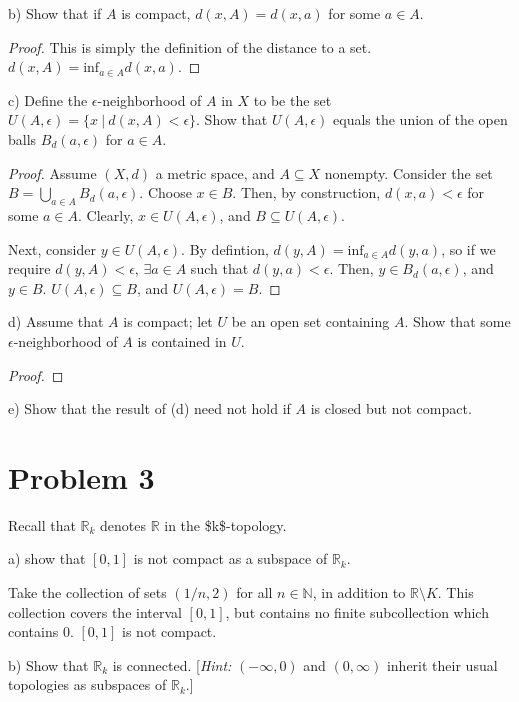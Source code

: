 \documentclass[11pt]{article}
\begin{document}
b) Show that if \(A\) is compact, \(d(x,A) = d(x,a)\) for some \(a \in A\). 
\begin{proof}
This is simply the definition of the distance to a set. \(d(x,A) =
\text{inf}_{a\in A} d(x,a)\). 
\end{proof}

c) Define the \(\epsilon\)-neighborhood of \(A\) in \(X\) to be the set \(U(A,\epsilon)
= \{x\ |\ d(x,A) < \epsilon\}\). Show that \(U(A,\epsilon)\) equals the union of
the open balls \(B_d(a, \epsilon)\) for \(a\in A\). 

\begin{proof}
Assume \((X,d)\) a metric space, and \(A\subseteq X\) nonempty. Consider the set \(B
= \bigcup\limits_{a\in A} B_d(a, \epsilon)\). Choose \(x \in B\). Then, by
construction, \(d(x,a) < \epsilon\) for some \(a \in A\). Clearly, \(x\in U(A,
\epsilon)\), and \(B\subseteq U(A, \epsilon)\). 

Next, consider \(y\in U(A, \epsilon)\). By defintion, \(d(y,A) =
\text{inf}_{a\in A} d(y,a)\), so if we require \(d(y,A) < \epsilon\),
\(\exists a\in A\) such that \(d(y,a) < \epsilon\). Then, \(y \in B_d(a, \epsilon)\),
and \(y\in B\). \(U(A, \epsilon) \subseteq B\), and \(U(A, \epsilon) = B\). 
\end{proof}

d) Assume that \(A\) is compact; let \(U\) be an open set containing \(A\). Show that
some \(\epsilon\)-neighborhood of \(A\) is contained in \(U\). 
\begin{proof}

\end{proof}
e) Show that the result of (d) need not hold if \(A\) is closed but not compact. 

\section{Problem 3}
\label{sec:org897d116}
Recall that \(\mathbb{R}_k\) denotes \(\mathbb{R}\) in the \$k\$-topology. 

a) show that \([0,1]\) is not compact as a subspace of \(\mathbb{R}_k\). 

Take the collection of sets \((1/n, 2)\) for all \(n\in\mathbb{N}\), in addition to
\(\mathbb{R}\setminus K\). This collection covers the interval \([0,1]\), but
contains no finite subcollection which contains 0. \([0,1]\) is not compact.  

b) Show that \(\mathbb{R}_k\) is connected. [\textit{Hint:} \((-\infty, 0)\) and
\((0, \infty)\) inherit their usual topologies as subspaces of \(\mathbb{R}_k\).]
\end{document}
